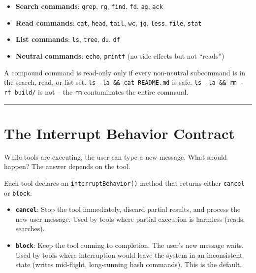 \documentclass[
  english,
  11pt,
  letterpaper,
]{book}
\providecommand{\tightlist}{%
  \setlength{\itemsep}{0pt}\setlength{\parskip}{0pt}}
\begin{document}
\begin{itemize}
\tightlist
\item
  \textbf{Search commands}: \texttt{grep}, \texttt{rg}, \texttt{find},
  \texttt{fd}, \texttt{ag}, \texttt{ack}
\item
  \textbf{Read commands}: \texttt{cat}, \texttt{head}, \texttt{tail},
  \texttt{wc}, \texttt{jq}, \texttt{less}, \texttt{file}, \texttt{stat}
\item
  \textbf{List commands}: \texttt{ls}, \texttt{tree}, \texttt{du},
  \texttt{df}
\item
  \textbf{Neutral commands}: \texttt{echo}, \texttt{printf} (no side
  effects but not ``reads'')
\end{itemize}

A compound command is read-only only if every non-neutral subcommand is
in the search, read, or list set. \texttt{ls\ -la\ \&\&\ cat\ README.md}
is safe. \texttt{ls\ -la\ \&\&\ rm\ -rf\ build/} is not -- the
\texttt{rm} contaminates the entire command.

\begin{center}\rule{0.5\linewidth}{0.5pt}\end{center}

\section{The Interrupt Behavior
Contract}\label{the-interrupt-behavior-contract}

While tools are executing, the user can type a new message. What should
happen? The answer depends on the tool.

Each tool declares an \texttt{interruptBehavior()} method that returns
either \texttt{\textquotesingle{}cancel\textquotesingle{}} or
\texttt{\textquotesingle{}block\textquotesingle{}}:

\begin{itemize}
\tightlist
\item
  \textbf{\texttt{\textquotesingle{}cancel\textquotesingle{}}}: Stop the
  tool immediately, discard partial results, and process the new user
  message. Used by tools where partial execution is harmless (reads,
  searches).
\item
  \textbf{\texttt{\textquotesingle{}block\textquotesingle{}}}: Keep the
  tool running to completion. The user's new message waits. Used by
  tools where interruption would leave the system in an inconsistent
  state (writes mid-flight, long-running bash commands). This is the
  default.
\end{itemize}
\end{document}
